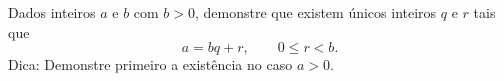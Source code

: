\begin{exercise} 
% 
    Dados inteiros $a$ e $b$ com $b > 0$, demonstre que existem únicos inteiros $q$ e $r$ tais que 
    $$ 
        a = bq + r, \qquad 0 \leq r < b. 
    $$ 
	Dica: Demonstre primeiro a existência no caso $a > 0$. 
\end{exercise} 
